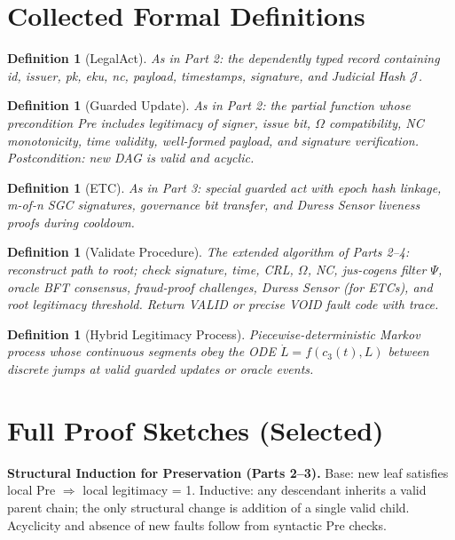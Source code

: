 \documentclass[11pt,a4paper]{article}
\newtheorem{definition}[theorem]{Definition}
\begin{document}
\begin{appendix}

\section{Collected Formal Definitions}

\begin{definition}[LegalAct]
As in Part 2: the dependently typed record containing id, issuer, pk, eku, nc, payload, timestamps, signature, and Judicial Hash \(\mathcal{J}\).
\end{definition}

\begin{definition}[Guarded Update]
As in Part 2: the partial function whose precondition Pre includes legitimacy of signer, issue bit, \(\Omega\) compatibility, NC monotonicity, time validity, well-formed payload, and signature verification. Postcondition: new DAG is valid and acyclic.
\end{definition}

\begin{definition}[ETC]
As in Part 3: special guarded act with epoch hash linkage, m-of-n SGC signatures, governance bit transfer, and Duress Sensor liveness proofs during cooldown.
\end{definition}

\begin{definition}[Validate Procedure]
The extended algorithm of Parts 2--4: reconstruct path to root; check signature, time, CRL, \(\Omega\), NC, jus-cogens filter \(\Psi\), oracle BFT consensus, fraud-proof challenges, Duress Sensor (for ETCs), and root legitimacy threshold. Return VALID or precise VOID fault code with trace.
\end{definition}

\begin{definition}[Hybrid Legitimacy Process]
Piecewise-deterministic Markov process whose continuous segments obey the ODE \(\dot{L} = f(c_3(t), L)\) between discrete jumps at valid guarded updates or oracle events.
\end{definition}

\section{Full Proof Sketches (Selected)}

\textbf{Structural Induction for Preservation (Parts 2--3).} Base: new leaf satisfies local Pre \(\Rightarrow\) local legitimacy = 1. Inductive: any descendant inherits a valid parent chain; the only structural change is addition of a single valid child. Acyclicity and absence of new faults follow from syntactic Pre checks.


\end{appendix}
\end{document}
